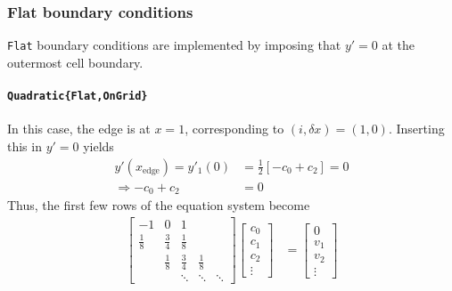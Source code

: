 \documentclass{article}
\begin{document}
\subsubsection{Flat boundary conditions}

\texttt{Flat} boundary conditions are implemented by imposing that $y' = 0$ at the outermost cell boundary.

\paragraph{\texttt{Quadratic\{Flat,OnGrid\}}}
In this case, the edge is at $x=1$, corresponding to $(i,\delta x) = (1,0)$. Inserting this in $y'=0$ yields
\begin{align*}
y'(x_{\text{edge}}) = y'_1(0) &= \frac{1}{2}\left[-c_0 + c_2\right] = 0\\
\Rightarrow - c_0 + c_2 &= 0
\end{align*}
Thus, the first few rows of the equation system become
\begin{align*}
\begin{bmatrix}
-1 & 0 & 1 \\
\frac{1}{8} & \frac{3}{4} & \frac{1}{8} \\
 & \frac{1}{8} & \frac{3}{4} & \frac{1}{8} \\
 & & \ddots & \ddots & \ddots
\end{bmatrix}
\begin{bmatrix}c_0\\ c_1\\ c_2\\\vdots\end{bmatrix}
&=
\begin{bmatrix}0\\ v_1 \\ v_2 \\\vdots\end{bmatrix}
\end{align*}
\end{document}

